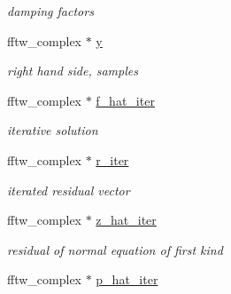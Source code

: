 \begin{CompactItemize}
\begin{CompactList}\small\item\em damping factors \item\end{CompactList}\item 
\hypertarget{structsolver__plan__complex_e05e9da3d96651d6a5d6456004791bde}{
fftw\_\-complex $\ast$ \hyperlink{structsolver__plan__complex_e05e9da3d96651d6a5d6456004791bde}{y}}
\label{structsolver__plan__complex_e05e9da3d96651d6a5d6456004791bde}

\begin{CompactList}\small\item\em right hand side, samples \item\end{CompactList}\item 
\hypertarget{structsolver__plan__complex_fac00cb681323619324be8787ff04f75}{
fftw\_\-complex $\ast$ \hyperlink{structsolver__plan__complex_fac00cb681323619324be8787ff04f75}{f\_\-hat\_\-iter}}
\label{structsolver__plan__complex_fac00cb681323619324be8787ff04f75}

\begin{CompactList}\small\item\em iterative solution \item\end{CompactList}\item 
\hypertarget{structsolver__plan__complex_384e2c5f7b782e8c1bc57981376e6ff3}{
fftw\_\-complex $\ast$ \hyperlink{structsolver__plan__complex_384e2c5f7b782e8c1bc57981376e6ff3}{r\_\-iter}}
\label{structsolver__plan__complex_384e2c5f7b782e8c1bc57981376e6ff3}

\begin{CompactList}\small\item\em iterated residual vector \item\end{CompactList}\item 
\hypertarget{structsolver__plan__complex_a554f9fda690f73783217b257a5faa03}{
fftw\_\-complex $\ast$ \hyperlink{structsolver__plan__complex_a554f9fda690f73783217b257a5faa03}{z\_\-hat\_\-iter}}
\label{structsolver__plan__complex_a554f9fda690f73783217b257a5faa03}

\begin{CompactList}\small\item\em residual of normal equation of first kind \item\end{CompactList}\item 
\hypertarget{structsolver__plan__complex_779777407a3de6429583efe2ab067fce}{
fftw\_\-complex $\ast$ \hyperlink{structsolver__plan__complex_779777407a3de6429583efe2ab067fce}{p\_\-hat\_\-iter}}
\label{structsolver__plan__complex_779777407a3de6429583efe2ab067fce}


\end{CompactItemize}
